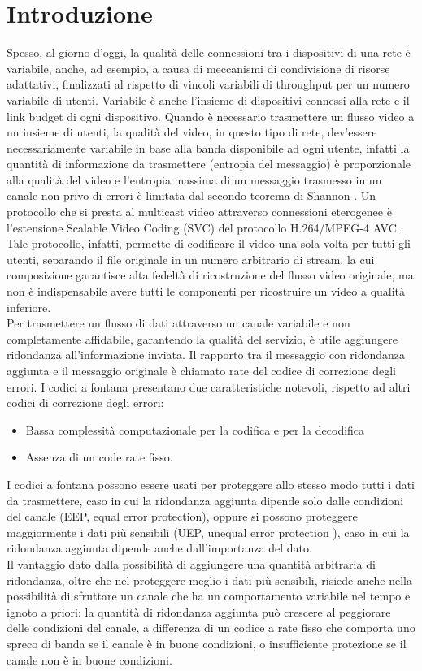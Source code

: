 \documentclass[italian, a4paper, 12pt]{article}
\begin{document}
\section{Introduzione} %
Spesso, al giorno d'oggi, la qualità delle connessioni tra i dispositivi di una rete è variabile, anche, ad esempio, a causa di meccanismi di condivisione di risorse adattativi, finalizzati al rispetto di vincoli variabili di throughput per un numero variabile di utenti. Variabile è anche l'insieme di dispositivi connessi alla rete e il link budget di ogni dispositivo. Quando è necessario trasmettere un flusso video a un insieme di utenti, la qualità del video, in questo tipo di rete, dev'essere necessariamente variabile in base alla banda disponibile ad ogni utente, infatti la quantità di informazione da trasmettere (entropia del messaggio) è proporzionale alla qualità del video e l'entropia massima di un messaggio trasmesso in un canale non privo di errori è limitata dal secondo teorema di Shannon \cite{shannon}. Un protocollo che si presta al multicast video attraverso connessioni eterogenee è l'estensione Scalable Video Coding (SVC) del protocollo H.264/MPEG-4 AVC \cite{svc}. Tale protocollo, infatti, permette di codificare il video una sola volta per tutti gli utenti, separando il file originale in un numero arbitrario di stream, la cui composizione garantisce alta fedeltà di ricostruzione del flusso video originale, ma non è indispensabile avere tutti le componenti per ricostruire un video a qualità inferiore.\\
Per trasmettere un flusso di dati attraverso un canale variabile e non completamente affidabile, garantendo la qualità del servizio, è utile aggiungere ridondanza all'informazione inviata. Il rapporto tra il messaggio con ridondanza aggiunta e il messaggio originale è chiamato rate del codice di correzione degli errori.
I codici a fontana \cite{fcsurvey, rossifc} presentano due caratteristiche notevoli, rispetto ad altri codici di correzione degli errori:
\begin{itemize}
\item Bassa complessità computazionale per la codifica e per la decodifica
\item Assenza di un code rate fisso.
\end{itemize}
I codici a fontana possono essere usati per proteggere allo stesso modo tutti i dati da trasmettere, caso in cui la ridondanza aggiunta dipende solo dalle condizioni del canale (EEP, equal error protection), oppure si possono proteggere maggiormente i dati più sensibili (UEP, unequal error protection \cite{uep}), caso in cui la ridondanza aggiunta dipende anche dall'importanza del dato.\\
Il vantaggio dato dalla possibilità di aggiungere una quantità arbitraria di ridondanza, oltre che nel proteggere meglio i dati più sensibili, risiede anche nella possibilità di sfruttare un canale che ha un comportamento variabile nel tempo e ignoto a priori: la quantità di ridondanza aggiunta può crescere al peggiorare delle condizioni del canale, a differenza di un codice a rate fisso che comporta uno spreco di banda se il canale è in buone condizioni, o insufficiente protezione se il canale non è in buone condizioni.
\end{document}
